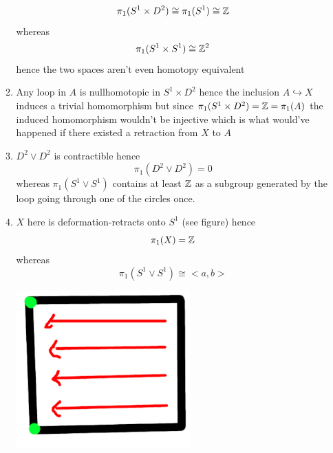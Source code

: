 \documentclass{article}
\begin{document}
\begin{homeworkProblem}
\begin{enumerate}[label=1.1.\arabic*]
\begin{enumerate}
            \[\pi_1(S^1 \times D^2) \cong \pi_1(S^1) \cong \mathbb{Z}\]
            whereas
            \[\pi_1(S^1 \times S^1) \cong \mathbb{Z}^2\]
            hence the two spaces aren't even homotopy equivalent
            \item Any loop in $A$ is nullhomotopic in $S^1 \times D^2$ hence the inclusion $A \hookrightarrow X$ induces a trivial homomorphism but since $\pi_1(S^1 \times D^2) = \mathbb{Z} = \pi_1(A)$ the induced homomorphism wouldn't be injective which is what would've happened if there existed a retraction from $X$ to $A$
            \item $D^2 \vee D^2$ is contractible hence
            \[\pi_1(D^2 \vee D^2) = 0\]
            whereas $\pi_1(S^1 \vee S^1)$ contains at least $\mathbb{Z}$ as a subgroup generated by the loop going through one of the circles once.
            \item $X$ here is deformation-retracts onto $S^1$ (see figure) hence
            \[\pi_1(X) = \mathbb{Z}\]
            whereas 
            \[\pi_1(S^1 \vee S^1) \cong <a, b>\]
            
            \centering
            \includegraphics[width=6 cm]{deformation.png}


\end{enumerate}
\end{enumerate}
\end{homeworkProblem}
\end{document}

